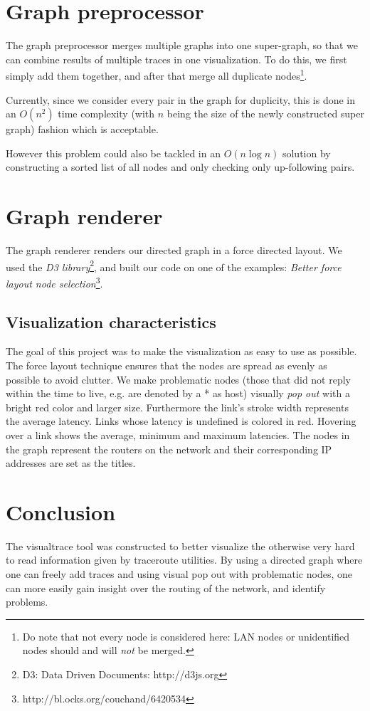 \documentclass[a4paper,10pt]{article}
\begin{document}
\section{Graph preprocessor}
The graph preprocessor merges multiple graphs into one super-graph, so that we can combine results of multiple traces in one visualization. To do this, we first simply add them together, and after that merge all duplicate nodes\footnote{Do note that not every node is considered here: LAN nodes or unidentified nodes should and will \emph{not} be merged.}.

Currently, since we consider every pair in the graph for duplicity, this is done in an $O(n^2)$ time complexity (with $n$ being the size of the newly constructed super graph) fashion which is acceptable.

However this problem could also be tackled in an $O(n \log n)$ solution by constructing a sorted list of all nodes and only checking only up-following pairs.

\section{Graph renderer}
The graph renderer renders our directed graph in a force directed layout. We used the \emph{D3 library}\footnote{D3: Data Driven Documents: http://d3js.org}, and built our code on one of the examples: \emph{Better force layout node selection}\footnote{http://bl.ocks.org/couchand/6420534}. 

\subsection{Visualization characteristics}
The goal of this project was to make the visualization as easy to use as possible. The force layout technique ensures that the nodes are spread as evenly as possible to avoid clutter. We make problematic nodes (those that did not reply within the time to live, e.g. are denoted by a * as host) visually \emph{pop out} with a bright red color and larger size. Furthermore the link's stroke width represents the average latency. Links whose latency is undefined is colored in red. Hovering over a link shows the average, minimum and maximum latencies. The nodes in the graph represent the routers on the network and their corresponding IP addresses are set as the titles.

\section{Conclusion}
The visualtrace tool was constructed to better visualize the otherwise very hard to read information given by traceroute utilities. By using a directed graph where one can freely add traces and using visual pop out with problematic nodes, one can more easily gain insight over the routing of the network, and identify problems.
\end{document}
